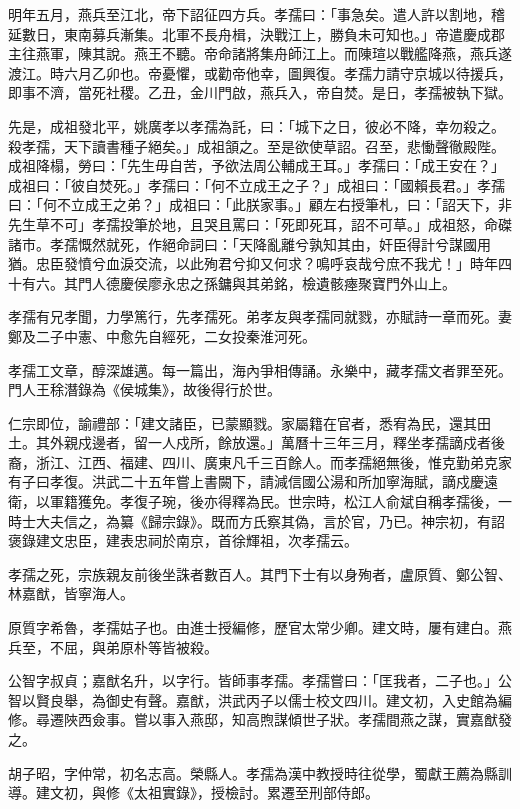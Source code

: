 \begin{pinyinscope}
明年五月，燕兵至江北，帝下詔征四方兵。孝孺曰：「事急矣。遣人許以割地，稽延數日，東南募兵漸集。北軍不長舟楫，決戰江上，勝負未可知也。」帝遣慶成郡主往燕軍，陳其說。燕王不聽。帝命諸將集舟師江上。而陳瑄以戰艦降燕，燕兵遂渡江。時六月乙卯也。帝憂懼，或勸帝他幸，圖興復。孝孺力請守京城以待援兵，即事不濟，當死社稷。乙丑，金川門啟，燕兵入，帝自焚。是日，孝孺被執下獄。

先是，成祖發北平，姚廣孝以孝孺為託，曰：「城下之日，彼必不降，幸勿殺之。殺孝孺，天下讀書種子絕矣。」成祖頷之。至是欲使草詔。召至，悲慟聲徹殿陛。成祖降榻，勞曰：「先生毋自苦，予欲法周公輔成王耳。」孝孺曰：「成王安在？」成祖曰：「彼自焚死。」孝孺曰：「何不立成王之子？」成祖曰：「國賴長君。」孝孺曰：「何不立成王之弟？」成祖曰：「此朕家事。」顧左右授筆札，曰：「詔天下，非先生草不可」孝孺投筆於地，且哭且罵曰：「死即死耳，詔不可草。」成祖怒，命磔諸市。孝孺慨然就死，作絕命詞曰：「天降亂離兮孰知其由，奸臣得計兮謀國用猶。忠臣發憤兮血淚交流，以此殉君兮抑又何求？鳴呼哀哉兮庶不我尤！」時年四十有六。其門人德慶侯廖永忠之孫鏞與其弟銘，檢遺骸瘞聚寶門外山上。

孝孺有兄孝聞，力學篤行，先孝孺死。弟孝友與孝孺同就戮，亦賦詩一章而死。妻鄭及二子中憲、中愈先自經死，二女投秦淮河死。

孝孺工文章，醇深雄邁。每一篇出，海內爭相傳誦。永樂中，藏孝孺文者罪至死。門人王稌潛錄為《侯城集》，故後得行於世。

仁宗即位，諭禮部：「建文諸臣，已蒙顯戮。家屬籍在官者，悉宥為民，還其田土。其外親戍邊者，留一人戍所，餘放還。」萬曆十三年三月，釋坐孝孺謫戍者後裔，浙江、江西、福建、四川、廣東凡千三百餘人。而孝孺絕無後，惟克勤弟克家有子曰孝復。洪武二十五年嘗上書闕下，請減信國公湯和所加寧海賦，謫戍慶遠衛，以軍籍獲免。孝復子琬，後亦得釋為民。世宗時，松江人俞斌自稱孝孺後，一時士大夫信之，為纂《歸宗錄》。既而方氏察其偽，言於官，乃已。神宗初，有詔褒錄建文忠臣，建表忠祠於南京，首徐輝祖，次孝孺云。

孝孺之死，宗族親友前後坐誅者數百人。其門下士有以身殉者，盧原質、鄭公智、林嘉猷，皆寧海人。

原質字希魯，孝孺姑子也。由進士授編修，歷官太常少卿。建文時，屢有建白。燕兵至，不屈，與弟原朴等皆被殺。

公智字叔貞；嘉猷名升，以字行。皆師事孝孺。孝孺嘗曰：「匡我者，二子也。」公智以賢良舉，為御史有聲。嘉猷，洪武丙子以儒士校文四川。建文初，入史館為編修。尋遷陜西僉事。嘗以事入燕邸，知高煦謀傾世子狀。孝孺間燕之謀，實嘉猷發之。

胡子昭，字仲常，初名志高。榮縣人。孝孺為漢中教授時往從學，蜀獻王薦為縣訓導。建文初，與修《太祖實錄》，授檢討。累遷至刑部侍郎。


\end{pinyinscope}
